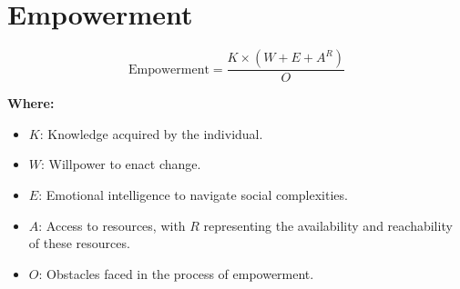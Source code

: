 \chapter{Empowerment}

\begin{equation}
\text{Empowerment} = \frac{K \times (W + E + A^R)}{O}
\end{equation}

\textbf{Where:}

\begin{itemize}
    \item $K$: Knowledge acquired by the individual.
    \item $W$: Willpower to enact change.
    \item $E$: Emotional intelligence to navigate social complexities.
    \item $A$: Access to resources, with $R$ representing the availability and reachability of these resources.
    \item $O$: Obstacles faced in the process of empowerment.
\end{itemize}